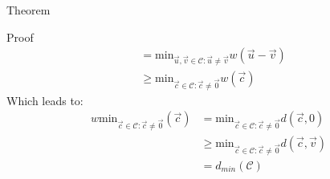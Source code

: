 \begin{parag}{Theorem}
\begin{subparag}{Proof}
\begin{align*}
        &= \text{min}_{\vec{u}, \vec{v} \in \mathcal{C}: \vec{u}\neq \vec{v}} w\left(\vec{u}-\vec{v}\right)\\
        &\geq \text{min}_{\vec{c} \in \mathcal{C}: \vec{c} \neq \vec{0}} w\left(\vec{c}\right)\end{align*}
        Which leads to:
        \begin{align*} 
           w \text{min}_{\vec{c}\in \mathcal{C}: \vec{c} \neq \vec{0}} \left(\vec{c}\right)&=  \text{min}_{\vec{c}\in \mathcal{C}: \vec{c} \neq \vec{0}} d\left(\vec{c}, 0\right)\\
                                                                                           &\geq  \text{min}_{\vec{c}\in \mathcal{C}: \vec{c} \neq \vec{0}}  d\left(\vec{c}, \vec{v}\right) \\
                                                                                           &= d_{min}\left(\mathcal{C}\right)
        \end{align*}
    \end{subparag}
\end{parag}


